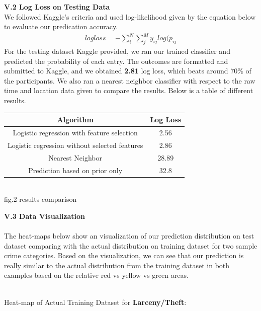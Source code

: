 \documentclass[12pt]{article}
\newenvironment{p4}[2][Part V Results and Evaluation]{\begin{trivlist}
\item[\hskip \labelsep {\bfseries #1}\hskip \labelsep {\bfseries #2}]}{\end{trivlist}}
\begin{document}
\begin{p4}{}
\item{\textbf{V.2 Log Loss on Testing Data}\\}
We followed Kaggle's criteria and used log-likelihood given by the equation below to evaluate our predication accuracy.
\begin{align*}
	logloss = -\sum_i^N \sum_j^M y_{ij} log (p_{ij}
\end{align*}
For the testing dataset Kaggle provided, we ran our trained classifier and predicted the probability of each entry. The outcomes are formatted and submitted to Kaggle, and we obtained \textbf{2.81} log loss, which beats around 70\% of the participants. We also ran a nearest neighbor classifier with respect to the raw time and location data given to compare the results. Below is a table of different results.
\begin{center}
	\begin{tabular}{||c c||} 
		\hline
	   	Algorithm & Log Loss \\
		\hline
		Logistic regression with feature selection & 2.56 \\
		\hline
		Logistic regression without selected features& 2.86 \\
		\hline
		Nearest Neighbor & 28.89 \\
		\hline
		Prediction based on prior only & 32.8 \\
		\hline
	\end{tabular}
	{\\fig.2 results comparison}
\end{center}
\item{\textbf{V.3 Data Visualization}\\}
\\ 
The heat-maps below show an visualization of  our prediction distribution on test dataset comparing with the actual distribution on training dataset for two sample crime categories. Based on the visualization, we can see that our prediction is really similar to the actual distribution from the training dataset in both examples based on the relative red vs yellow vs green areas. \\
\\
\newpage
\begin{center}
Heat-map of Actual Training Dataset for \textbf{Larceny/Theft}:\\

\end{center}
\end{p4}
\end{document}
